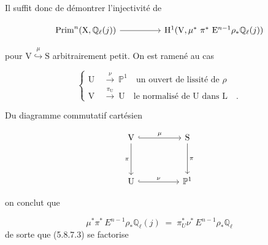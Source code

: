 Il suffit donc de démontrer l'injectivité de

\begin{equation*}
\begin{tikzcd}[column sep=huge]
\mathrm{Prim}^n(\mathrm{X},\mathbb{Q}_\ell(j)) \arrow[r] & \mathrm{H}^1(\mathrm{V},\mu^* \ \pi^* \ \mathrm{E}^{n-1}\rho_*\mathbb{Q}_\ell(j))
\end{tikzcd}
\end{equation*}

pour $\mathrm{V} \overset{\mu}{\hookrightarrow} \mathrm{S}$ arbitrairement petit. On est ramené au cas

\begin{equation*}
\left\{
\begin{aligned}
\mathrm{U} \ &\overset{\nu}{\longrightarrow} \ \mathbb{P}^1 \quad \text{un ouvert de lissité de } \rho \\
\mathrm{V} \ &\overset{\pi_{\mathrm{U}}}{\longrightarrow} \ \mathrm{U} \quad \text{le normalisé de U dans L} \quad .
\end{aligned}
\right.
\end{equation*}

Du diagramme commutatif cartésien

\begin{equation*}
\begin{tikzcd}[column sep=huge, row sep=huge]
\mathrm{V} \arrow[r, hook, "\mu"] \arrow[d, "\pi"'] & \mathrm{S} \arrow[d, "\pi"] \\
\mathrm{U} \arrow[r, hook, "\nu"] & \mathbb{P}^1
\end{tikzcd}
\end{equation*}



 on conclut que

\begin{equation*}
\mu^*\pi^*\, E^{n-1}\rho_*\mathbb{Q}_\ell(j) \;=\; \pi_U^*\nu^*\, E^{n-1}\rho_*\mathbb{Q}_\ell
\end{equation*}
de sorte que (5.8.7.3) se factorise

